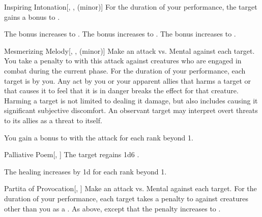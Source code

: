 {\begin{freeability}{Inspiring Intonation}[, ,  (minor)]
                For the duration of your performance, the target gains a  bonus to .

                \rankline
                 The bonus increases to .
                 The bonus increases to .
                 The bonus increases to .
            \end{freeability}

            \begin{freeability}{Mesmerizing Melody}[, ,  (minor)]
                Make an attack vs. Mental against each target.
                You take a  penalty to  with this attack against creatures who are engaged in combat during the current phase.
                \hit For the duration of your performance, each target is \fascinated by you.
                Any act by you or your apparent allies that harms a target or that causes it to feel that it is in danger breaks the effect for that creature.
                Harming a target is not limited to dealing it damage, but also includes causing it significant subjective discomfort.
                An observant target may interpret overt threats to its allies as a threat to itself.

                \rankline
                You gain a  bonus to  with the attack for each rank beyond 1.
            \end{freeability}

            \begin{freeability}{Palliative Poem}[, ]
                The target regains 1d6 .

                \rankline
                The healing increases by \plus1d for each rank beyond 1.
            \end{freeability}

            \begin{freeability}{Partita of Provocation}[, ]
                Make an attack vs. Mental against each target.
                \hit For the duration of your performance, each target takes a  penalty to  against creatures other than you as a .
                \crit As above, except that the penalty increases to .


\end{freeability}}
